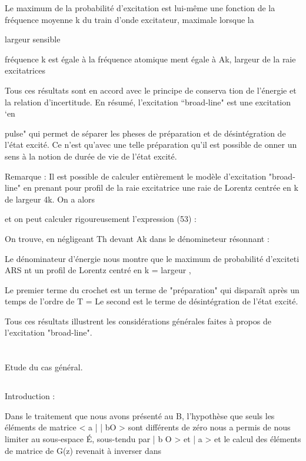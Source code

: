 Le maximum de la probabilité d'excitation est lui-même une fonction de la fréquence moyenne k du train d'onde excitateur, maximale lorsque la

largeur sensible

fréquence k est égale à la fréquence atomique
ment égale à Ak, largeur de la raie excitatrices

Tous ces résultats sont en accord avec le principe de conserva
tion de l'énergie et la relation d'incertitude.
En résumé, l'excitation “broad-line" est une excitation ‘en

pulse" qui permet de séparer les pheses de préparation et de désintégration de
l'état excité. Ce n'est qu'avec une telle préparation qu'il est possible de onner un sens à la notion de durée de vie de l'état excité.

Remarque : Il est possible de calculer entièrement le modèle d'excitation "broad-line"
en prenant pour profil de la raie excitatrice une raie de Lorentz centrée en k
de largeur 4k. On a alors

et on peut calculer rigoureusement l'expression (53) :

On trouve, en négligeant Th devant Ak dans le dénomineteur résonnant :


Le dénominateur d'énergie nous montre que le maximum de probabilité d'exciteti ARS nt un profil de Lorentz centré en k = 
largeur ,

Le premier terme du crochet est un terme de "préparation" qui
disparaît après un temps de l'ordre de T =  Le second est le terme de
désintégration de l'état excité.

Tous ces résultats illustrent les considérations générales faites à propos de l'excitation "broad-line".

\section{} Etude du cas général.%
\subsection{} Introduction :%

Dans le traitement que nous avons présenté au  B, l'hypothèse
que seuls les éléments de matrice < a | | bO > sont différents de zéro
nous a permis de nous limiter au sous-espace É, sous-tendu par | b O > et
| a > et le calcul des éléments de matrice de G(z) revenait à inverser dans

